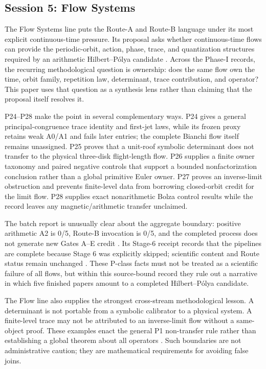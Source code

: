 \hypertarget{session-5-flow-systems}{%
\subsection{Session 5: Flow Systems}\label{session-5-flow-systems}}

The Flow Systems line puts the Route-A and Route-B language under its most explicit continuous-time pressure. Its proposal asks whether continuous-time flows can provide the periodic-orbit, action, phase, trace, and quantization structures required by an arithmetic Hilbert--Pólya candidate . Across the Phase-I records, the recurring methodological question is ownership: does the same flow own the time, orbit family, repetition law, determinant, trace contribution, and operator? This paper uses that question as a synthesis lens rather than claiming that the proposal itself resolves it.

P24--P28 make the point in several complementary ways. P24 gives a general principal-congruence trace identity and first-jet laws, while its frozen proxy retains weak A0/A1 and fails later entries; the complete Bianchi flow itself remains unassigned. P25 proves that a unit-roof symbolic determinant does not transfer to the physical three-disk flight-length flow. P26 supplies a finite owner taxonomy and paired negative controls that support a bounded nonfactorization conclusion rather than a global primitive Euler owner. P27 proves an inverse-limit obstruction and prevents finite-level data from borrowing closed-orbit credit for the limit flow. P28 supplies exact nonarithmetic Bolza control results while the record leaves any magnetic/arithmetic transfer unclaimed.

The batch report is unusually clear about the aggregate boundary: positive arithmetic A2 is 0/5, Route-B invocation is 0/5, and the completed process does not generate new Gates A--E credit . Its Stage-6 receipt records that the pipelines are complete because Stage 6 was explicitly skipped; scientific content and Route status remain unchanged . These P-class facts must not be treated as a scientific failure of all flows, but within this source-bound record they rule out a narrative in which five finished papers amount to a completed Hilbert--Pólya candidate.

The Flow line also supplies the strongest cross-stream methodological lesson. A determinant is not portable from a symbolic calibrator to a physical system. A finite-level trace may not be attributed to an inverse-limit flow without a same-object proof. These examples enact the general P1 non-transfer rule rather than establishing a global theorem about all operators  . Such boundaries are not administrative caution; they are mathematical requirements for avoiding false joins.


